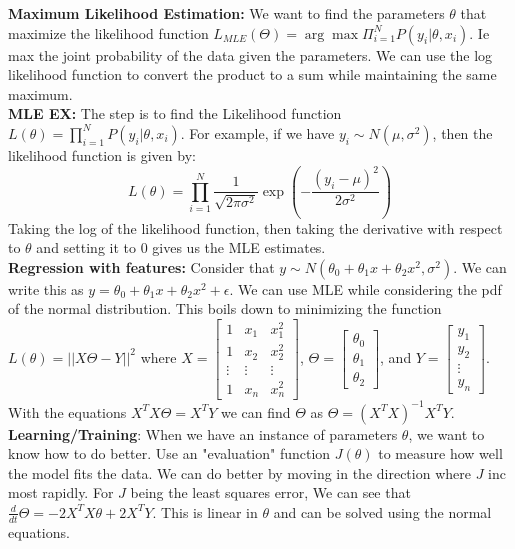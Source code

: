 \documentclass[answers,12pt,addpoints]{exam}
\begin{document}
\newpage

\textbf{Maximum Likelihood Estimation:} We want to find the parameters $\theta$ that maximize the likelihood function $L_{MLE}(\Theta) = \arg \max \Pi_{i=1}^N P(y_i | \theta, x_i)$. Ie max the joint probability of the data given the parameters. We can use the log likelihood function to convert the product to a sum while maintaining the same maximum.\\

\textbf{MLE EX:} The step is to find the Likelihood function $L(\theta) = \prod_{i=1}^N P(y_i | \theta, x_i)$. For example, if we have $y_i \sim N(\mu, \sigma^2)$, then the likelihood function is given by:
$$L(\theta) = \prod_{i=1}^N \frac{1}{\sqrt{2\pi \sigma^2}} \exp\left(-\frac{(y_i - \mu)^2}{2\sigma^2}\right)$$
Taking the log of the likelihood function, then taking the derivative with respect to $\theta$ and setting it to 0 gives us the MLE estimates.\\

\textbf{Regression with features:} Consider that $y \sim N(\theta_0 + \theta_1 x + \theta_2 x^2, \sigma^2)$. We can write this as $y = \theta_0 + \theta_1 x + \theta_2 x^2 + \epsilon$. We can use MLE while considering the pdf of the normal distribution. This boils down to minimizing the function $L(\theta) = || X \Theta - Y ||^2$  where $X = \begin{bmatrix}
    1 & x_1 & x_1^2 \\
    1 & x_2 & x_2^2 \\
    \vdots & \vdots & \vdots \\
    1 & x_n & x_n^2
\end{bmatrix}$, $\Theta = \begin{bmatrix}
    \theta_0 \\
    \theta_1 \\
    \theta_2
\end{bmatrix}$, and $Y = \begin{bmatrix}
    y_1 \\
    y_2 \\
    \vdots \\
    y_n
\end{bmatrix}$. With the equations $X^T X \Theta = X^T Y$ we can find $\Theta$ as $\Theta = (X^T X)^{-1}X^T Y$.\\

\textbf{Learning/Training}: When we have an instance of parameters $\theta$, we want to know how to do better. Use an "evaluation" function $J(\theta)$ to measure how well the model fits the data. We can do better by moving in the direction where $J$ inc most rapidly. For $J$ being the least squares error, We can see that $\frac{d}{dt} \Theta = -2 X^T X \theta + 2 X^T Y$. This is linear in $\theta$ and can be solved using the normal equations.\\
\end{document}
